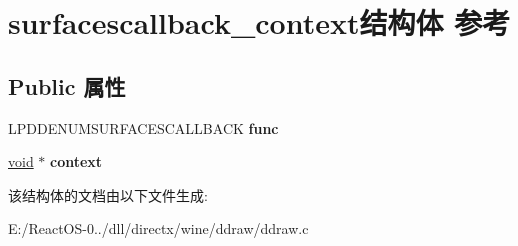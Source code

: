 \hypertarget{structsurfacescallback__context}{}\section{surfacescallback\+\_\+context结构体 参考}
\label{structsurfacescallback__context}
\subsection*{Public 属性}
\begin{DoxyCompactItemize}
\item 
\mbox{\label{structsurfacescallback__context_a42deb313501dc1884b3c99eb085b10d0}} 
L\+P\+D\+D\+E\+N\+U\+M\+S\+U\+R\+F\+A\+C\+E\+S\+C\+A\+L\+L\+B\+A\+CK {\bfseries func}
\item 
\mbox{\label{structsurfacescallback__context_a8156501635778999b0554e62fe93e368}} 
\hyperlink{interfacevoid}{void} $\ast$ {\bfseries context}
\end{DoxyCompactItemize}


该结构体的文档由以下文件生成\+:\begin{DoxyCompactItemize}
\item 
E\+:/\+React\+O\+S-\/0../dll/directx/wine/ddraw/ddraw.\+c\end{DoxyCompactItemize}
